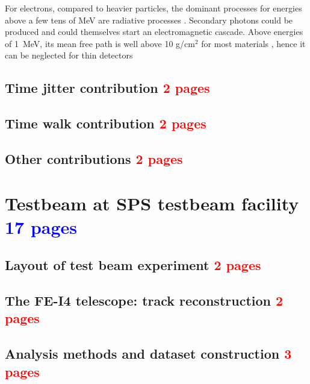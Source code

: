		For electrons, compared to heavier particles, the dominant processes for energies above a few tens of MeV are radiative processes \cite{Paolozzi_thesis}. Secondary photons could be produced and could themselves start an electromagnetic cascade. Above energies of \SI{1}{\mega\electronvolt}, its mean free path is well above 10 g/cm$^2$ for most materials \cite{PDG}, hence it can be neglected for thin detectors
	 	  
		\subsection{Time jitter contribution \textcolor{red}{ 2 pages}}
		\subsection{Time walk contribution \textcolor{red}{ 2 pages}}
		\subsection{Other contributions \textcolor{red}{ 2 pages}}
	
	\clearpage
	\section{ Testbeam at SPS testbeam facility \textcolor{blue}{ 17 pages}}
		\subsection{Layout of test beam experiment \textcolor{red}{ 2 pages}} 
		\subsection{The FE-I4 telescope: track reconstruction \textcolor{red}{ 2 pages}}
		\subsection{Analysis methods and dataset construction \textcolor{red}{ 3 pages}}
		
